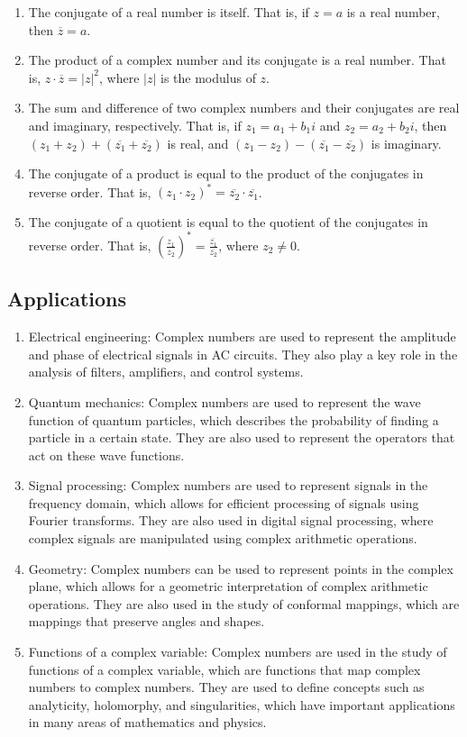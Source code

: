 \documentclass{article}
\begin{document}
\begin{enumerate}
    \item The conjugate of a real number is itself. That is, if $z = a$ is a real number, then $\overline{z} = a$.
    \item The product of a complex number and its conjugate is a real number. That is, $z \cdot \overline{z} = |z|^2$, where $|z|$ is the modulus of $z$.
    \item The sum and difference of two complex numbers and their conjugates are real and imaginary, respectively. That is, if $z_1 = a_1 + b_1i$ and $z_2 = a_2 + b_2i$, then $(z_1 + z_2) + (\overline{z_1}+\overline{z_2})$ is real, and $(z_1 - z_2) - (\overline{z_1}-\overline{z_2})$ is imaginary.
    \item The conjugate of a product is equal to the product of the conjugates in reverse order. That is, $(z_1 \cdot z_2)^* = \overline{z_2} \cdot \overline{z_1}$.
    \item The conjugate of a quotient is equal to the quotient of the conjugates in reverse order. That is, $\left(\frac{z_1}{z_2}\right)^* = \frac{\overline{z_1}}{\overline{z_2}}$, where $z_2 \neq 0$. 
\end{enumerate}

\subsection{Applications}
\begin{enumerate}
    \item Electrical engineering: Complex numbers are used to represent the amplitude and phase of electrical signals in AC circuits. They also play a key role in the analysis of filters, amplifiers, and control systems.
    \item Quantum mechanics: Complex numbers are used to represent the wave function of quantum particles, which describes the probability of finding a particle in a certain state. They are also used to represent the operators that act on these wave functions.
    \item Signal processing: Complex numbers are used to represent signals in the frequency domain, which allows for efficient processing of signals using Fourier transforms. They are also used in digital signal processing, where complex signals are manipulated using complex arithmetic operations.
    \item Geometry: Complex numbers can be used to represent points in the complex plane, which allows for a geometric interpretation of complex arithmetic operations. They are also used in the study of conformal mappings, which are mappings that preserve angles and shapes.
    \item Functions of a complex variable: Complex numbers are used in the study of functions of a complex variable, which are functions that map complex numbers to complex numbers. They are used to define concepts such as analyticity, holomorphy, and singularities, which have important applications in many areas of mathematics and physics.
\end{enumerate}
\end{document}
